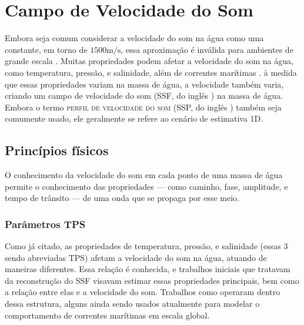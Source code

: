 \section{Campo de Velocidade do Som}
\label{sec:campo_de_velocidade_do_som}

Embora seja comum considerar a velocidade do som na água como uma constante, em torno de $1500 \si{\meter/\second}$, essa aproximação é inválida para ambientes de grande escala \cite{kieffer_sound_1977,trusler_determination_2017,li_sound_2015,pinson_sound_2010}. Muitas propriedades podem afetar a velocidade do som na água, como temperatura, pressão, e salinidade, além de correntes marítimas \cite{wilson_speed_1959,medwin_fundamentals_1999,mcdougall_getting_2011,delgrosso_new_1974}. à medida que essas propriedades variam na massa de água, a velocidade também varia, criando um \gls{campo de velocidade do som} (SSF, do inglês ) na massa de água. Embora o termo \textsc{perfil de velocidade do som} (SSP, do inglês ) \cite{li_acoustic_2019,li_sound_2015,pinson_sound_2010} também seja comumente usado, ele geralmente se refere ao cenário de estimativa 1D.

\subsection{Princípios físicos}

O conhecimento da velocidade do som em cada ponto de uma massa de água permite o conhecimento das propriedades --- como caminho, fase, amplitude, e tempo de trânsito --- de uma onda que se propaga por esse meio.

\subsubsection*{Parâmetros TPS}

Como já citado, as propriedades de temperatura, pressão, e salinidade (essas 3 sendo abreviadas TPS) afetam a velocidade do som na água, atuando de maneiras diferentes. Essa relação é conhecida, e trabalhos iniciais que tratavam da reconstrução do SSF visavam estimar essas propriedades principais, bem como a relação entre elas e a velocidade do som. Trabalhos como \cite{wilson_speed_1959,medwin_fundamentals_1999,mcdougall_getting_2011,delgrosso_new_1974,chen_speed_1977,wong_speed_1995,roquet_accurate_2015,mackenzie_nineterm_1981,wilson_equation_1960} operaram dentro dessa estrutura, alguns ainda sendo usados atualmente para modelar o comportamento de correntes marítimas em escala global.

